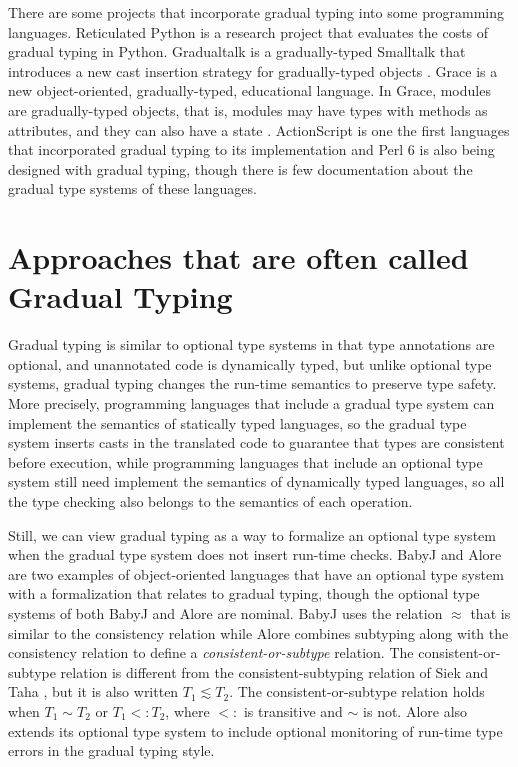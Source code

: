 There are some projects that incorporate gradual typing into some
programming languages.
Reticulated Python \cite{reticulated,vitousek2014deg} is a research
project that evaluates the costs of gradual typing in Python.
Gradualtalk \cite{allende2013gts} is a gradually-typed Smalltalk
that introduces a new cast insertion strategy for gradually-typed
objects \cite{allende2013cis}.
Grace \cite{black2012grace,black2013sg} is a new object-oriented,
gradually-typed, educational language.
In Grace, modules are gradually-typed objects, that is, modules
may have types with methods as attributes, and they can also have
a state \cite{homer2013modules}.
ActionScript \cite{moock2007as3} is one the first languages that
incorporated gradual typing to its implementation and
Perl 6 \cite{tang2007pri} is also being designed with gradual typing,
though there is few documentation about the gradual type systems
of these languages.

\section{Approaches that are often called Gradual Typing}
\label{sec:approaches}

Gradual typing is similar to optional type systems in that type
annotations are optional, and unannotated code is dynamically
typed, but unlike optional type systems, gradual typing changes
the run-time semantics to preserve type safety.
More precisely, programming languages that include a gradual type
system can implement the semantics of statically typed languages, so
the gradual type system inserts casts in the translated code to
guarantee that types are consistent before execution, while
programming languages that include an optional type system still
need implement the semantics of dynamically typed languages, so all
the type checking also belongs to the semantics of each operation.

Still, we can view gradual typing as a way to formalize an optional
type system when the gradual type system does not insert run-time
checks.
BabyJ \cite{anderson2003babyj} and Alore \cite{lehtosalo2011alore}
are two examples of object-oriented languages that have an
optional type system with a formalization that relates to gradual typing,
though the optional type systems of both BabyJ and Alore are nominal.
BabyJ uses the relation $\approx$ that is similar to the consistency
relation while Alore combines subtyping along with the consistency
relation to define a \emph{consistent-or-subtype} relation.
The consistent-or-subtype relation is different from the
consistent-subtyping relation of Siek and Taha \cite{siek2007objects},
but it is also written $T_{1} \lesssim T_{2}$.
The consistent-or-subtype relation holds when $T_{1} \sim T_{2}$
or $T_{1} <: T_{2}$, where $<:$ is transitive and $\sim$ is not.
Alore also extends its optional type system to include optional
monitoring of run-time type errors in the gradual typing style.

